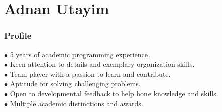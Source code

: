 \documentclass{tccv}
\begin{document}
\part{Adnan Utayim}


\section{Profile}
$\bullet$ 5 years of academic programming experience. \\
$\bullet$ Keen attention to details and exemplary organization skills.\\
$\bullet$ Team player with a passion to learn and contribute.\\
$\bullet$ Aptitude for solving challenging problems.\\
$\bullet$ Open to developmental feedback to help hone knowledge and skills. \\
$\bullet$ Multiple academic distinctions and awards.
\end{document}
